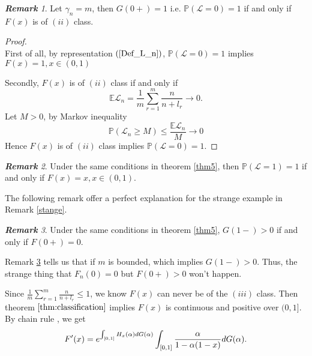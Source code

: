 \documentclass[12pt]{article}
\theoremstyle{plain}
\theoremstyle{definition}
\theoremstyle{remark}
\newtheorem{rem}{\textbf{Remark}}
\begin{document}
\begin{rem}
Let $\gamma_n=m$,  then $G(0+)=1$ i.e. $\mathbb{P}(\mathscr{L}=0)=1$ if and only if $F(x)$ is of $(ii)$ class.
\end{rem}
\begin{proof}\ \\
	
	First of all, by representation $(\ref{Def_L_n})$, $\mathbb{P}(\mathscr{L}=0)=1$ implies $F(x)=1, x\in (0,1)$
	
	Secondly,
	$F(x)$ is of $(ii)$ class if and only if 
	\begin{equation*}
		\mathbb{E}\mathscr{L}_n=\frac{1}{m} \sum_{r=1}^{m} \frac{n}{n+l_{r}} \rightarrow 0.
	\end{equation*}
	Let $M>0$, by Markov inequality
	\begin{equation*}
		\mathbb{P}(\mathscr{L}_n\geq M)\leq \frac{\mathbb{E}\mathscr{L}_n}{M} \rightarrow 0
	\end{equation*}
	Hence $F(x)$ is of $(ii)$ class implies $\mathbb{P}(\mathscr{L}=0)=1$. 
\end{proof}


\begin{rem}
Under the same conditions in theorem \ref{thm5}, then $\mathbb{P}(\mathscr{L}=1)=1$ if and only if $F(x)=x,x\in (0,1)$.\\
\end{rem}
The following remark offer a perfect explanation for the strange example in Remark \ref{stange}.
\begin{rem}\label{useless1}
	Under the same conditions in theorem \ref{thm5}, $G(1-)>0$ if and only if $F(0+)=0$. \\
\end{rem}
Remark \ref{useless1} tells us that if $m$ is bounded, which implies $G(1-)>0$. Thus, the strange thing that $F_n(0)=0$ but $F(0+)>0$ won't happen.

Since $\frac{1}{m} \sum_{r=1}^{m} \frac{n}{n+l_{r}}\leq 1$, we know $F(x)$ can never be of the $(iii)$ class. Then theorem $\ref{thm:classification}$  implies $F(x)$ is continuous and positive over $(0,1]$.\\ 
By chain rule%
, we get 
\begin{equation}
F'(x)=e^{\int_{[0,1]}H_{x}(\alpha)dG(\alpha)}\int_{[0,1]}\dfrac{\alpha}{1-\alpha(1-x)}dG(\alpha).\\
\end{equation}
\end{document}

